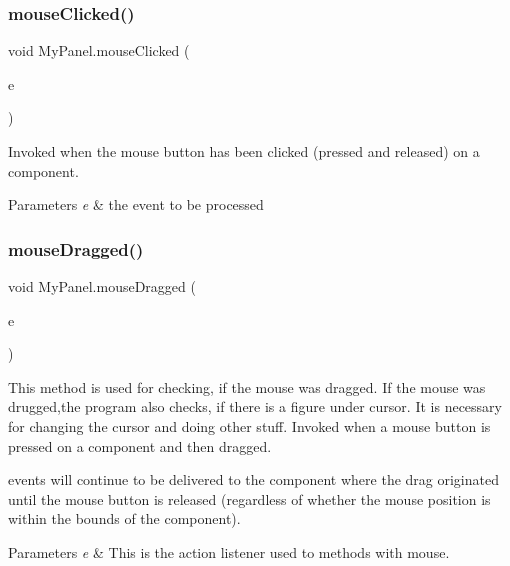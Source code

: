 \subsubsection{\texorpdfstring{mouseClicked()}{mouseClicked()}}
{\footnotesize\ttfamily void My\+Panel.\+mouse\+Clicked (\begin{DoxyParamCaption}\item[{Mouse\+Event}]{e }\end{DoxyParamCaption})}

Invoked when the mouse button has been clicked (pressed and released) on a component. 
\begin{DoxyParams}{Parameters}
{\em e} & the event to be processed \\
\hline
\end{DoxyParams}
\mbox{\label{class_my_panel_a89449fea451e2350cdec8bd638d36344}} 
\subsubsection{\texorpdfstring{mouseDragged()}{mouseDragged()}}
{\footnotesize\ttfamily void My\+Panel.\+mouse\+Dragged (\begin{DoxyParamCaption}\item[{Mouse\+Event}]{e }\end{DoxyParamCaption})}

This method is used for checking, if the mouse was dragged. If the mouse was drugged,the program also checks, if there is a figure under cursor. It is necessary for changing the cursor and doing other stuff. Invoked when a mouse button is pressed on a component and then dragged.
\begin{DoxyCode}{0}
\end{DoxyCode}
 events will continue to be delivered to the component where the drag originated until the mouse button is released (regardless of whether the mouse position is within the bounds of the component). 


\begin{DoxyParams}{Parameters}
{\em e} & This is the action listener used to methods with mouse. \\
\hline
\end{DoxyParams}
\mbox{\label{class_my_panel_afaf9c657c61bebb715330371b17b9852}} 
